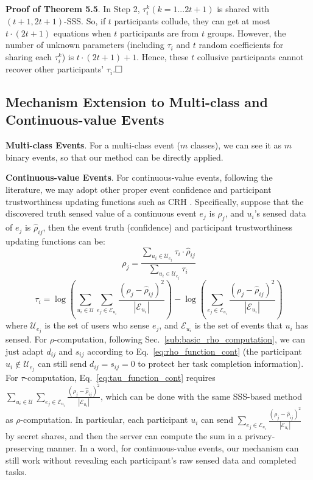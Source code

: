 \noindent \textbf{Proof of Theorem 5.5}. In Step 2, $\tau_i^k (k=1...2t+1)$ is shared with $(t+1, 2t+1)$-SSS. So, if $t$ participants collude, they can get at most $t\cdot(2t+1)$ equations when $t$ participants are from $t$ groups. However, the number of unknown parameters (including $\tau_i$ and $t$ random coefficients for sharing each $\tau_i^k$) is $t\cdot(2t+1)+1$. Hence, these $t$ collusive participants cannot recover other participants' $\tau_i$.$\qed$

\subsection{Mechanism Extension to Multi-class and Continuous-value Events}



\textbf{Multi-class Events}. For a multi-class event ($m$ classes), we can see it as $m$ binary events, so that our method can be directly applied.

\noindent \textbf{Continuous-value Events}. For continuous-value events, following the literature, we may adopt other proper event confidence and participant trustworthiness updating functions such as CRH \cite{Xu2019EfficientAP,Zheng2020PrivacyAwareAE}. Specifically, suppose that the discovered truth sensed value of a continuous event $e_j$ is $\rho_j$, and $u_i$'s sensed data of $e_j$ is $\hat \rho_{ij}$, then the event truth (confidence) and participant trustworthiness updating functions  can be:
\begin{equation}
	\rho_j = \frac{\sum_{u_i \in \mathcal U_{e_j}}\tau_i \cdot \hat \rho_{ij}}{\sum_{u_i \in \mathcal U_{e_j}}\tau_i}
	\label{eq:rho_function_cont}
\end{equation}
\begin{equation}
	\tau_i = \log(\sum_{u_i \in \mathcal U} \sum_{e_j \in \mathcal E_{u_i}} \frac{(\rho_j- \hat \rho_{ij})^2}{|\mathcal E_{u_i}|}) - \log(\sum_{e_j \in \mathcal E_{u_i}} \frac{(\rho_j- \hat \rho_{ij})^2}{|\mathcal E_{u_i}|})
	\label{eq:tau_function_cont}
\end{equation}
where $\mathcal U_{e_j}$ is the set of users who sense $e_j$, and $\mathcal E_{u_i}$ is the set of events that $u_i$ has sensed. For $\rho$-computation, following Sec.~\ref{sub:basic_rho_computation}, we can just adapt $d_{ij}$ and $s_{ij}$ according to Eq.~\ref{eq:rho_function_cont} (the participant $u_i \not \in \mathcal U_{e_j}$ can still send $d_{ij}=s_{ij}=0$ to protect her task completion information). For $\tau$-computation, Eq.~\ref{eq:tau_function_cont} requires $\sum_{u_i \in \mathcal U} \sum_{e_j \in \mathcal E_{u_i}} \frac{(\rho_j- \hat \rho_{ij})^2}{|\mathcal E_{u_i}|}$, which can be done with the same SSS-based method as $\rho$-computation. In particular, each participant $u_i$ can send $\sum_{e_j \in \mathcal E_{u_i}} \frac{(\rho_j- \hat \rho_{ij})^2}{|\mathcal E_{u_i}|}$ by secret shares, and then the server can compute the sum in a privacy-preserving manner. In a word, for continuous-value events, our mechanism can still work without revealing each participant's raw sensed data and completed tasks.



